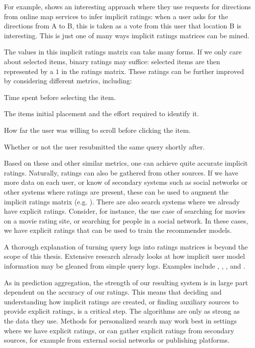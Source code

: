 For example, \cite{Venetis2011} shows an interesting approach where they use requests for directions
from online map services to infer implicit ratings:
when a user asks for the directions from A to B, this is taken 
as a vote from this user that location B is interesting.
This is just one of many ways implicit ratings matrices can be mined.

The values in this implicit ratings matrix can take many forms.
If we only care about selected items, binary ratings may suffice:
selected items are then represented by a $1$ in the ratings matrix.
These ratings can be further improved by considering different metrics, including:

\begin{itemize*}
  \item Time spent before selecting the item.
  \item The items initial placement and the effort required to identify it.
  \item How far the user was willing to scroll before clicking the item.
  \item Whether or not the user resubmitted the same query shortly after.
\end{itemize*}

Based on these and other similar metrics, one can achieve quite accurate implicit ratings.
Naturally, ratings can also be gathered from other sources.
If we have more data on each user, or know of secondary systems such as social networks
or other systems where ratings are present, these can be used to augment the implicit ratings matrix
(e.g. \cite{Carmel2009}).
There are also search systems where we already have explicit ratings.
Consider, for instance, the use case of searching for movies on a movie rating site,
or searching for people in a social network.
In these cases, we have explicit ratings that can be used to train the recommender models.

A thorough explanation of turning query logs into ratings matrices
is beyond the scope of this thesis. Extensive research already
looks at how implicit user model information may be gleaned
from simple query logs. Examples include \cite{Joachims2007},
\cite{Lee2005}, \cite{Agichtein2006}, \cite{Mobasher} and
\cite{Speretta2000}.

As in prediction aggregation, the strength of our resulting system is in large part dependent on the accuracy of our ratings.
This means that deciding and understanding how implicit ratings are created, or 
finding auxiliary sources to provide explicit ratings, is a critical step.
The algorithms are only as strong as the data they use.
Methods for personalized search may work best in settings where we have explicit ratings,
or can gather explicit ratings from secondary sources, for example from external social networks or publishing platforms.

